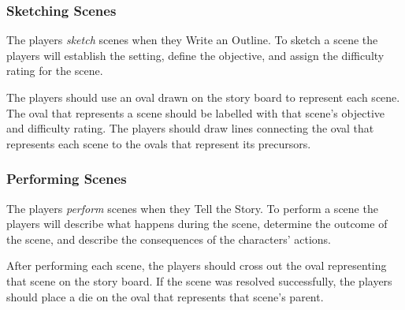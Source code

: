 \documentclass[12pt, a5paper, parskip=half-]{scrartcl}
\begin{document}
\newpage

\subsubsection*{Sketching Scenes}
The players \emph{sketch} scenes when they {\cinzel \small Write an Outline}. 
To sketch a scene the players will establish the setting, define the objective, and assign the difficulty rating for the scene.

The players should use an oval drawn on the story board to represent each scene.
The oval that represents a scene should be labelled with that scene's objective and difficulty rating. 
The players should draw lines connecting the oval that represents each scene to the ovals that represent its precursors.


\subsubsection*{Performing Scenes}
The players \emph{perform} scenes when they {\cinzel \small Tell the Story}.
To perform a scene the players will describe what happens during the scene, determine the outcome of the scene, and describe the consequences of the characters' actions.

After performing each scene, the players should cross out the oval representing that scene on the story board. If the scene was resolved successfully, the players should place a die on the oval that represents that scene's parent.
\newpage
\end{document}
